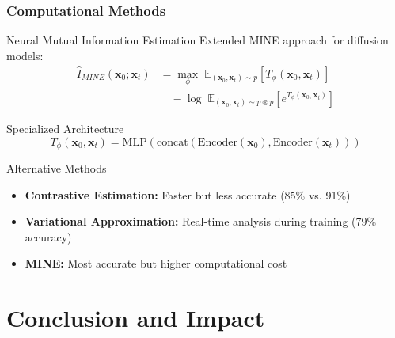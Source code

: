 \documentclass[aspectratio=169]{beamer}
\begin{document}
\begin{frame}
\frametitle{Computational Methods}
\begin{block}{Neural Mutual Information Estimation}
Extended MINE approach for diffusion models:
\begin{align}
\hat{I}_{MINE}(\mathbf{x}_0; \mathbf{x}_t) &= \max_\phi \; \mathbb{E}_{(\mathbf{x}_0, \mathbf{x}_t) \sim p}[T_\phi(\mathbf{x}_0, \mathbf{x}_t)] \\
&\quad - \log \; \mathbb{E}_{(\mathbf{x}_0, \mathbf{x}_t) \sim p \otimes p}[e^{T_\phi(\mathbf{x}_0, \mathbf{x}_t)}]
\end{align}
\end{block}

\begin{block}{Specialized Architecture}
\begin{equation}
T_\phi(\mathbf{x}_0, \mathbf{x}_t) = \text{MLP}(\text{concat}(\text{Encoder}(\mathbf{x}_0), \text{Encoder}(\mathbf{x}_t)))
\end{equation}
\end{block}

\begin{block}{Alternative Methods}
\begin{itemize}
\item \textbf{Contrastive Estimation:} Faster but less accurate (85\% vs. 91\%)
\item \textbf{Variational Approximation:} Real-time analysis during training (79\% accuracy)
\item \textbf{MINE:} Most accurate but higher computational cost
\end{itemize}
\end{block}
\end{frame}

\section{Conclusion and Impact}
\end{document}
